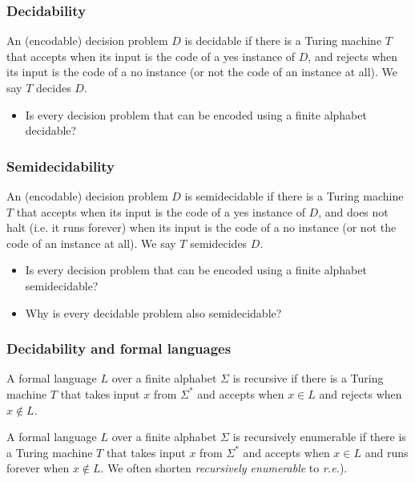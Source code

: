 \documentclass[handout]{beamer}
\begin{document}
\begin{frame}
\frametitle{Decidability}

\begin{definition}[Decidable]\label{D:dec}
An (encodable) decision problem $D$ is decidable if there is a Turing machine $T$ that accepts when its input is the code of a yes instance of $D$, and rejects when its input is the code of a no instance (or not the code of an instance at all). We say $T$ decides $D$.
\end{definition}
\vspace{0.5cm}
\begin{itemize}
\item Is every decision problem that can be encoded using a finite alphabet decidable? 
\end{itemize}
\end{frame}

\begin{frame}
\frametitle{Semidecidability}
\begin{definition}[Semidecidable]\label{D:semidec}
An (encodable) decision problem $D$ is semidecidable if there is a Turing machine $T$ that accepts when its input is the code of a yes instance of $D$, and does not halt (i.e. it runs forever) when its input is the code of a no instance (or not the code of an instance at all). We say $T$ semidecides $D$.
\end{definition}  
\vspace{0.5cm}
\begin{itemize}
\item Is every decision problem that can be encoded using a finite alphabet semidecidable?
\vspace{0.2cm}
\item Why is every decidable problem also semidecidable? 
\end{itemize}
\end{frame}

\begin{frame}
\frametitle{Decidability and formal languages}
\begin{definition}[recursive]
A formal language $L$ over a finite alphabet $\Sigma$ is recursive if there is a Turing machine $T$ that takes input $x$ from $\Sigma^*$ and accepts when $x\in L$ and rejects when $x\notin L$.  
\end{definition}
\vspace{0.4cm}
\begin{definition}
A formal language $L$ over a finite alphabet $\Sigma$ is recursively enumerable if there is a Turing machine $T$ that takes input $x$ from $\Sigma^*$ and accepts when $x\in L$ and runs forever when $x\notin L$. We often shorten \emph{recursively enumerable} to \emph{r.e.}).  
\end{definition}
\end{frame}
\end{document}
